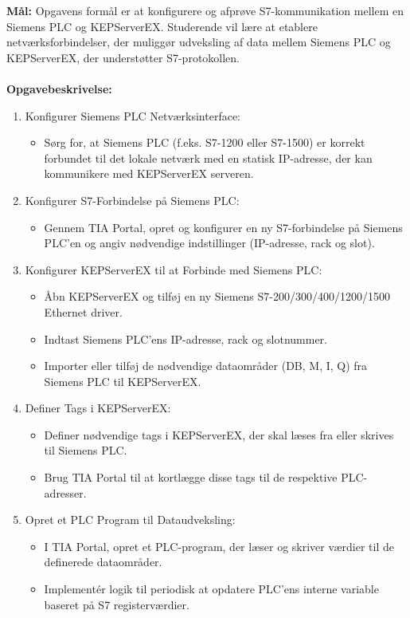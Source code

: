 \textbf{Mål:} Opgavens formål er at konfigurere og afprøve S7-kommunikation mellem en Siemens PLC og KEPServerEX. Studerende vil lære at etablere netværksforbindelser, der muliggør udveksling af data mellem Siemens PLC og KEPServerEX, der understøtter S7-protokollen.
\\\\
\noindent\textbf{Opgavebeskrivelse:}
\begin{enumerate}
	\item Konfigurer Siemens PLC Netværksinterface:
	\begin{itemize}
		\item Sørg for, at Siemens PLC (f.eks. S7-1200 eller S7-1500) er korrekt forbundet til det lokale netværk med en statisk IP-adresse, der kan kommunikere med KEPServerEX serveren.
	\end{itemize}
	\item Konfigurer S7-Forbindelse på Siemens PLC:
	\begin{itemize}
		\item Gennem TIA Portal, opret og konfigurer en ny S7-forbindelse på Siemens PLC'en og angiv nødvendige indstillinger (IP-adresse, rack og slot).
	\end{itemize}
	\item Konfigurer KEPServerEX til at Forbinde med Siemens PLC:
	\begin{itemize}
		\item Åbn KEPServerEX og tilføj en ny Siemens S7-200/300/400/1200/1500 Ethernet driver.
		\item Indtast Siemens PLC’ens IP-adresse, rack og slotnummer.
		\item Importer eller tilføj de nødvendige dataområder (DB, M, I, Q) fra Siemens PLC til KEPServerEX.
	\end{itemize}
	\item Definer Tags i KEPServerEX:
	\begin{itemize}
		\item Definer nødvendige tags i KEPServerEX, der skal læses fra eller skrives til Siemens PLC.
		\item Brug TIA Portal til at kortlægge disse tags til de respektive PLC-adresser.
	\end{itemize}
	\item Opret et PLC Program til Dataudveksling:
	\begin{itemize}
		\item I TIA Portal, opret et PLC-program, der læser og skriver værdier til de definerede dataområder.
		\item Implementér logik til periodisk at opdatere PLC'ens interne variable baseret på S7 registerværdier.

\end{itemize}
\end{enumerate}
